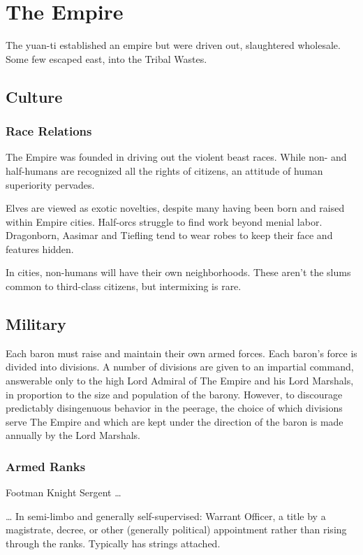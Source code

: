 \section{The Empire}

The yuan-ti established an empire but were driven out, slaughtered wholesale.
Some few escaped east, into the Tribal Wastes.

\subsection{Culture}
\subsubsection{Race Relations}
The Empire was founded in driving out the violent beast races.
While non- and half-humans are recognized all the rights of citizens, an attitude of human
 superiority pervades.

Elves are viewed as exotic novelties, despite many having been born and raised within Empire cities.
Half-orcs struggle to find work beyond menial labor.
Dragonborn, Aasimar and Tiefling tend to wear robes to keep their face and features hidden.

In cities, non-humans will have their own neighborhoods.
These aren't the slums common to third-class citizens, but intermixing is rare.

\subsection{Military}
Each baron must raise and maintain their own armed forces.
Each baron's force is divided into divisions.
A number of divisions are given to an impartial command, answerable only to the high Lord Admiral
 of The Empire and his Lord Marshals, in proportion to the size and population of the barony.
However, to discourage predictably disingenuous behavior in the peerage, the choice of which
 divisions serve The Empire and which are kept under the direction of the baron is made
 annually by the Lord Marshals.

\subsubsection{Armed Ranks}
Footman \textrightarrow
Knight \textrightarrow
Sergent \textrightarrow \ldots

\ldots \textrightarrow
In semi-limbo and generally self-supervised:
Warrant Officer, a title by a magistrate, decree, or other (generally political)
  appointment rather than rising through the ranks.
Typically has strings attached.

